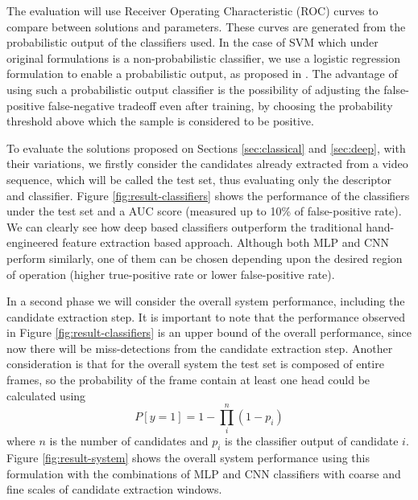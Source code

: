     The evaluation will use Receiver Operating Characteristic (ROC) curves to compare between solutions and parameters. These curves are generated from the probabilistic output of the classifiers used. In the case of SVM which under original formulations is a non-probabilistic classifier, we use a logistic regression formulation to enable a probabilistic output, as proposed in \cite{svmProbabilisticOutput}. The advantage of using such a probabilistic output classifier is the possibility of adjusting the false-positive false-negative tradeoff even after training, by choosing the probability threshold above which the sample is considered to be positive.

    To evaluate the solutions proposed on Sections \ref{sec:classical} and \ref{sec:deep}, with their variations, we firstly consider the candidates already extracted from a video sequence, which will be called the test set, thus evaluating only the descriptor and classifier. Figure \ref{fig:result-classifiers} shows the performance of the classifiers under the test set and a AUC score (measured up to 10\% of false-positive rate). We can clearly see how deep based classifiers outperform the traditional hand-engineered feature extraction based approach. Although both MLP and CNN perform similarly, one of them can be chosen depending upon the desired region of operation (higher true-positive rate or lower false-positive rate).

    \begin{figure*}[!t]
    \centering
    \label{fig:result-classifiers-all}
    \hfil
    \label{fig:result-classifiers-all-zoom}
    \caption{Classifiers performance.}
    \label{fig:result-classifiers}
    \end{figure*}

    In a second phase we will consider the overall system performance, including the candidate extraction step. It is important to note that the performance observed in Figure \ref{fig:result-classifiers} is an upper bound of the overall performance, since now there will be miss-detections from the candidate extraction step. Another consideration is that for the overall system the test set is composed of entire frames, so the probability of the frame contain at least one head could be calculated using
    \begin{equation}
    P[y=1] = 1 - \prod_i^n (1-p_i)
    \end{equation}
    where $n$ is the number of candidates and $p_i$ is the classifier output of candidate $i$. Figure \ref{fig:result-system} shows the overall system performance using this formulation with the combinations of MLP and CNN classifiers with coarse and fine scales of candidate extraction windows.

